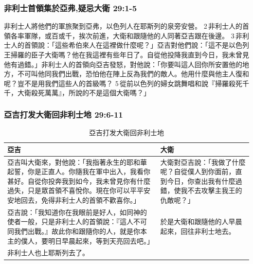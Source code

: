\subsubsection{非利士首領集於亞弗,疑忌大衛 29:1-5}
非利士人將他們的軍旅聚到亞弗，以色列人在耶斯列的泉旁安營。 2 非利士人的首領各率軍隊，或百或千，挨次前進，大衛和跟隨他的人同著亞吉跟在後邊。 3 非利士人的首領說：「這些希伯來人在這裡做什麼呢？」亞吉對他們說：「這不是以色列王掃羅的臣子大衛嗎？他在我這裡有些年日了。自從他投降我直到今日，我未曾見他有過錯。」非利士人的首領向亞吉發怒，對他說：「你要叫這人回你所安置他的地方，不可叫他同我們出戰，恐怕他在陣上反為我們的敵人。他用什麼與他主人復和呢？豈不是用我們這些人的首級嗎？ 5 從前以色列的婦女跳舞唱和說『掃羅殺死千千，大衛殺死萬萬』，所說的不是這個大衛嗎？」

\subsubsection{亞吉打发大衛回非利士地 29:6-11}
\begin{table}[H]
\hspace*{-5mm}
\centering
\begin{tabular}{p{}|p{7.25cm}}\hline\hline
亞吉&大衛\\\hline
亞吉叫大衛來，對他說：「我指著永生的耶和華起誓，你是正直人。你隨我在軍中出入，我看你甚好。自從你投奔我到如今，我未曾見你有什麼過失，只是眾首領不喜悅你。現在你可以平平安安地回去，免得非利士人的首領不歡喜你。」&大衛對亞吉說：「我做了什麼呢？自從僕人到你面前，直到今日，你查出我有什麼過錯，使我不去攻擊主我王的仇敵呢？」\\\hline
亞吉說：「我知道你在我眼前是好人，如同神的使者一般，只是非利士人的首領說：『這人不可同我們出戰。』故此你和跟隨你的人，就是你本主的僕人，要明日早晨起來，等到天亮回去吧。」 &於是大衛和跟隨他的人早晨起來，回往非利士地去。\\\hline
非利士人也上耶斯列去了。&\\\hline
\end{tabular}
\caption{亞吉打发大衛回非利士地}
\end{table}

